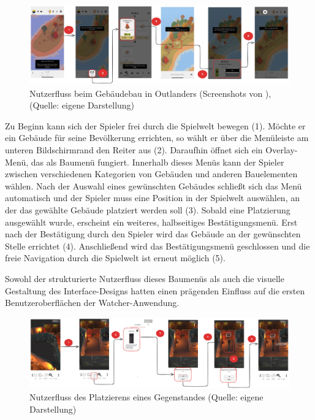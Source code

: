 \begin{figure}[ht]
\centering
\includegraphics[width=1\linewidth]{content/pictures/Nutzerflow.png}
\caption{Nutzerfluss beim Gebäudebau in Outlanders (Screenshots von \cite{coates_game_nodate}), (Quelle: eigene Darstellung)}
\label{fig:userflow-outlanders-build}
\end{figure}

Zu Beginn kann sich der Spieler frei durch die Spielwelt bewegen (1). Möchte er ein Gebäude für seine Bevölkerung errichten, so wählt er über die Menüleiste am unteren Bildschirmrand den Reiter  aus (2). Daraufhin öffnet sich ein Overlay-Menü, das als Baumenü fungiert. Innerhalb dieses Menüs kann der Spieler zwischen verschiedenen Kategorien von Gebäuden und anderen Bauelementen wählen. Nach der Auswahl eines gewünschten Gebäudes schließt sich das Menü automatisch und der Spieler muss eine Position in der Spielwelt auswählen, an der das gewählte Gebäude platziert werden soll (3). Sobald eine Platzierung ausgewählt wurde, erscheint ein weiteres, halbseitiges Bestätigungsmenü. Erst nach der Bestätigung durch den Spieler wird das Gebäude an der gewünschten Stelle errichtet (4). Anschließend wird das Bestätigungsmenü geschlossen und die freie Navigation durch die Spielwelt ist erneut möglich (5).

Sowohl der strukturierte Nutzerfluss dieses Baumenüs als auch die visuelle Gestaltung des Interface-Designs hatten einen prägenden Einfluss auf die ersten Benutzeroberflächen der Watcher-Anwendung.

\begin{figure}[ht]
\centering
\includegraphics[width=1\linewidth]{content/pictures/PlacementFlow.png}
\caption{Nutzerfluss des Platzierens eines Gegenstandes (Quelle: eigene Darstellung)}
\label{fig:userflow-placement-cm}
\end{figure}

